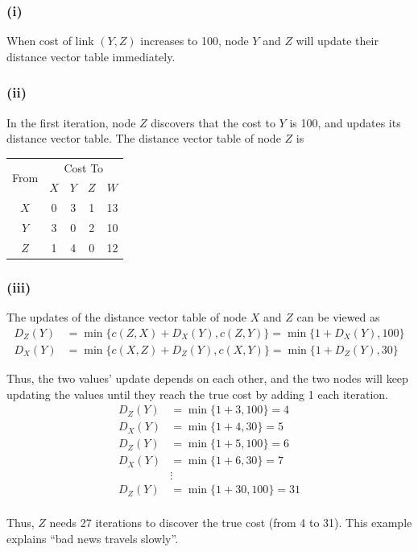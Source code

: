 \documentclass[a4paper,12pt]{article}
\begin{document}
\subsubsection*{(i)}

When cost of link $(Y, Z)$ increases to 100, node $Y$ and $Z$ will update their distance vector table immediately. 

\subsubsection*{(ii)}

In the first iteration, node $Z$ discovers that the cost to $Y$ is 100, and updates its distance vector table. The distance vector table of node $Z$ is

\begin{table}[H]
  \centering
  \begin{tabular}{ccccc}
    \toprule
    \multirow{2}{*}{From} & \multicolumn{4}{c}{Cost To} \\
    \cmidrule{2-5}
    & $X$ & $Y$ & $Z$ & $W$ \\
    \midrule
    $X$ & 0 & 3 & 1 & 13 \\
    $Y$ & 3 & 0 & 2 & 10 \\
    $Z$ & 1 & 4 & 0 & 12 \\
    \bottomrule
  \end{tabular}
\end{table}

\subsubsection*{(iii)}

The updates of the distance vector table of node $X$ and $Z$ can be viewed as
\begin{align*}
  D_Z(Y) &= \min\{c(Z, X) + D_X(Y), c(Z, Y)\} = \min\{1 + D_X(Y), 100\} \\
  D_X(Y) &= \min\{c(X, Z) + D_Z(Y), c(X, Y)\} = \min\{1 + D_Z(Y), 30\}
\end{align*}

Thus, the two values' update depends on each other, and the two nodes will keep updating the values until they reach the true cost by adding 1 each iteration.
\begin{align*}
  D_Z(Y) &= \min\{1 + 3, 100\} = 4 \\
  D_X(Y) &= \min\{1 + 4, 30\} = 5 \\
  D_Z(Y) &= \min\{1 + 5, 100\} = 6 \\
  D_X(Y) &= \min\{1 + 6, 30\} = 7 \\
  &\vdots \\
  D_Z(Y) &= \min\{1 + 30, 100\} = 31 \\
\end{align*}

Thus, $Z$ needs 27 iterations to discover the true cost (from 4 to 31). This example explains ``bad news travels slowly''.
\end{document}
